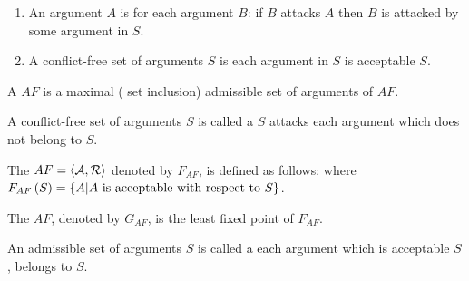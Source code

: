 \begin{defi}
\begin{enumerate}
 \item An argument $A$ is  \iffTx{} for each argument $B$: if $B$ attacks $A$ then $B$ is attacked by some argument in $S$.
 \item A conflict-free set of arguments $S$ is  \iffTx{} each argument in $S$ is acceptable \wrtTx{} $S$.
\end{enumerate}
\cite{conf/ijcai/Dung93}
\end{defi}

\begin{defi}
A  $AF$ is a maximal (\wrtTx{} set inclusion) admissible set of arguments of $AF$.
\cite{conf/ijcai/Dung93}
\end{defi}

\begin{defi}
A conflict-free set of arguments $S$ is called a  \iffTx{} $S$ attacks each argument which does not belong to $S$.
\cite{conf/ijcai/Dung93}
\end{defi}

\begin{defi}
The  $AF=\left\langle \mathcal{A},\mathcal{R}\right\rangle$ denoted by $F_{AF}$, is defined as follows:  where $F_{AF}\left(S\right)=\left\{ A|A\mbox{ is acceptable with respect to{} }S\right\}$.
\cite{conf/ijcai/Dung93}
\end{defi}

\begin{defi}
The  $AF$, denoted by $G_{AF}$, is the least fixed point of $F_{AF}$.
\cite{conf/ijcai/Dung93}
\end{defi}

\begin{defi}
An admissible set of arguments $S$ is called a  \iffTx{} each argument which is acceptable \wrtTx{} $S$, belongs to $S$.
\cite{conf/ijcai/Dung93}
\end{defi}

